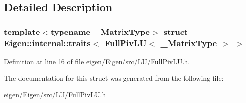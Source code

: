 \subsection{Detailed Description}
\subsubsection*{template$<$typename \+\_\+\+Matrix\+Type$>$\newline
struct Eigen\+::internal\+::traits$<$ Full\+Piv\+L\+U$<$ \+\_\+\+Matrix\+Type $>$ $>$}



Definition at line \hyperlink{eigen_2_eigen_2src_2_l_u_2_full_piv_l_u_8h_source_l00016}{16} of file \hyperlink{eigen_2_eigen_2src_2_l_u_2_full_piv_l_u_8h_source}{eigen/\+Eigen/src/\+L\+U/\+Full\+Piv\+L\+U.\+h}.



The documentation for this struct was generated from the following file\+:\begin{DoxyCompactItemize}
\item 
eigen/\+Eigen/src/\+L\+U/\+Full\+Piv\+L\+U.\+h\end{DoxyCompactItemize}
